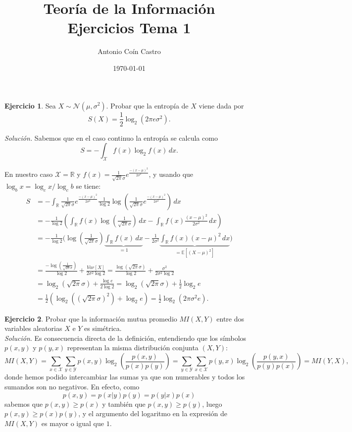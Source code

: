 \documentclass[11pt,a4paper]{article}
\title{Teoría de la Información\\ \Large{Ejercicios Tema 1} }
\author{Antonio Coín Castro}
\date{\today}
\newcommand{\fx}{\frac{1}{\sqrt{2\pi}\sigma} e^{\frac{-(x-\mu)^2}{2\sigma^2}}}
\newcommand{\R}{\mathbb{R}}
\begin{document}
\maketitle

\textbf{Ejercicio 1}. Sea $X \sim \mathcal{N}(\mu, \sigma^2)$. Probar que la entropía de $X$ viene dada por
\[
S(X)=\frac{1}{2}\log_2(2\pi e\sigma^2).
\]

\textit{Solución.} Sabemos que en el caso continuo la entropía se calcula como
\[
S=-\int_{\mathcal X} f(x)\log_2f(x)\, dx.
\]

En nuestro caso $\mathcal X=\mathbb{R}$ y $f(x)=\fx$, y usando que $\log_b x=\log_c x / \log_c b$ se tiene:
\begin{align*}
S &= -\int_\R \fx \frac{1}{\log 2}\log\left(\fx \right)\, dx \\
&= -\frac{1}{\log 2} \left( \int_\R f(x) \log\left( \frac{1}{\sqrt{2\pi}\sigma} \right)\, dx - \int_\R f(x)\frac{(x-\mu)^2}{2\sigma^2}\, dx\right) \\
&= -\frac{1}{\log 2} \Bigg( \log\left( \frac{1}{\sqrt{2\pi}\sigma}\right) \underbrace{\int_\R f(x)\, dx}_{=1} - \frac{1}{2\sigma^2} \underbrace{\int_\R f(x)(x-\mu)^2\, dx}_{=\mathbb{E}[(X - \mu)^2]} \Bigg) \\
&= \frac{-\log\left(\frac{1}{\sqrt{2\pi}\sigma}\right)}{\log 2} + \frac{Var[X]}{2\sigma^2\log 2} = \frac{\log(\sqrt{2\pi}\sigma)}{\log 2} + \frac{\sigma^2}{2\sigma^2\log 2}\\
&= \log_2(\sqrt{2\pi}\sigma) + \frac{\log e}{2\log 2} = \log_2(\sqrt{2\pi}\sigma) + \frac{1}{2}\log_2 e \\
&= \frac{1}{2}(\log_2 ((\sqrt{2\pi}\sigma)^2) + \log_2 e)= \frac{1}{2}\log_2(2\pi\sigma^2 e).
\end{align*}

\vspace{1em}
\textbf{Ejercicio 2}. Probar que la información mutua promedio $MI(X,Y)$ entre dos variables aleatorias $X$ e $Y$ es simétrica.\\

\textit{Solución}. Es consecuencia directa de la definición, entendiendo que los símbolos $p(x,y)$ y $p(y,x)$ representan la misma distribución conjunta $(X,Y)$:
\[
MI(X,Y) = \sum_{x \in \mathcal X} \sum_{y \in \mathcal Y} p(x,y)\log_2 \left(\frac{p(x,y)}{p(x)p(y)}\right) = \sum_{y \in \mathcal Y} \sum_{x \in \mathcal X} p(y,x)\log_2 \left(\frac{p(y,x)}{p(y)p(x)}\right) = MI(Y,X),
\]
donde hemos podido intercambiar las sumas ya que son numerables y todos los sumandos son no negativos. En efecto, como
\[
p(x,y)=p(x|y)p(y)=p(y|x)p(x)
\]
sabemos que $p(x,y)\ge p(x)$ y también que $p(x,y)\ge p(y)$, luego $p(x,y)\ge p(x)p(y)$, y el argumento del logaritmo en la expresión de $MI(X,Y)$ es mayor o igual que $1$.\\
\end{document}
